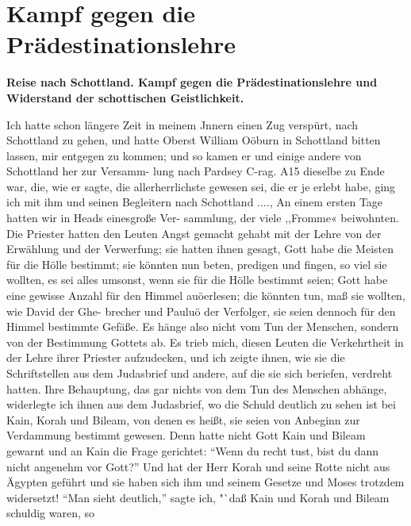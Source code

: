 
\chapter[Kampf gegen die Prädestinationslehre]{Kampf gegen die Prädestinationslehre}

\begin{center}
\textbf{Reise nach Schottland. Kampf gegen die 
Prädestinationslehre und Widerstand der schottischen 
Geistlichkeit.}
\end{center}

Ich hatte schon längere Zeit in meinem Jnnern einen Zug
verspürt, nach Schottland zu gehen, und hatte Oberst William
Oöburn in Schottland bitten lassen, mir entgegen zu kommen; und
so kamen er und einige andere von Schottland her zur Versamm-
lung nach Pardsey C-rag. A15 dieselbe zu Ende war, die, wie
er sagte, die allerherrlichste gewesen sei, die er je erlebt habe,
ging ich mit ihm und seinen Begleitern nach Schottland ....,
An einem ersten Tage hatten wir in Heads einesgroße Ver-
sammlung, der viele ,,Fromme« beiwohnten. Die Priester hatten
den Leuten Angst gemacht gehabt mit der Lehre von der Erwählung
und der Verwerfung; sie hatten ihnen gesagt, Gott habe die Meisten
für die Hölle bestimmt; sie könnten nun beten, predigen und fingen,
so viel sie wollten, es sei alles umsonst, wenn sie für die Hölle
bestimmt seien; Gott habe eine gewisse Anzahl für den Himmel
auöerlesen; die könnten tun, maß sie wollten, wie David der Ghe-
brecher und Pauluö der Verfolger, sie seien dennoch für den
Himmel bestimmte Gefäße. Es hänge also nicht vom Tun der
Menschen, sondern von der Bestimmung Gottets ab. Es trieb
mich, diesen Leuten die Verkehrtheit in der Lehre ihrer Priester
aufzudecken, und ich zeigte ihnen, wie sie die Schriftstellen aus
dem Judasbrief und andere, auf die sie sich beriefen, verdreht
hatten. Ihre Behauptung, das gar nichts von dem Tun des
Menschen abhänge, widerlegte ich ihnen aus dem Judasbrief, wo
die Schuld deutlich zu sehen ist bei Kain, Korah und Bileam, von
denen es heißt, sie seien von Anbeginn zur Verdammung bestimmt
gewesen. Denn hatte nicht Gott Kain und Bileam gewarnt und
an Kain die Frage gerichtet: "`Wenn du recht tust, bist du dann
nicht angenehm vor Gott?"' Und hat der Herr Korah und seine
Rotte nicht aus Ägypten geführt und sie haben sich ihm und
seinem Gesetze und Moses trotzdem widersetzt! "`Man sieht deutlich,"'
sagte ich, "`daß Kain und Korah und Bileam schuldig waren, so
